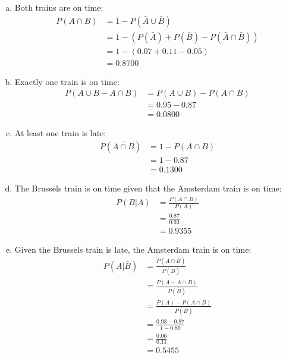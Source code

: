 \documentclass{scrartcl}
\begin{document}
\begin{enumerate}
\begin{enumerate}[a)]
\item Both trains are on time:\\
\begin{align*}
P(A \cap B) &= 1 - P(\bar{A}\cup\bar{B})\\
            &= 1 - \left(P(\bar{A}) + P(\bar{B}) - P(\bar{A}\cap\bar{B})\right)\\
            &= 1 - \left(0.07 + 0.11 - 0.05\right)\\
            &= 0.8700
\end{align*}

\item Exactly one train is on time:\\
\begin{align*}
P(A \cup B - A \cap B) &= P(A \cup B) - P(A \cap B)\\
                       &= 0.95 - 0.87\\
                       &= 0.0800
\end{align*}

\item At least one train is late:\\
\begin{align*}
P(\bar{A \cap B}) &= 1 - P(A \cap B)\\
                  &= 1 - 0.87\\
                  &= 0.1300
\end{align*}

\item The Brussels train is on time given that the Amsterdam train is on time:\\
\begin{align*}
P(B|A) &= \frac{P(A \cap B)}{P(A)}\\
       &= \frac{0.87}{0.93}\\
       &= 0.9355
\end{align*}

\item Given the Brussels train is late, the Amsterdam train is on time:\\
\begin{align*}
P(A|\bar{B}) &= \frac{P(A\cap\bar{B})}{P(\bar{B})}\\
             &= \frac{P(A - A \cap B)}{P(\bar{B})}\\
             &= \frac{P(A)-P(A \cap B)}{P(\bar{B})}\\
             &= \frac{0.93-0.87}{1-0.89}\\
             &= \frac{0.06}{0.11}\\
             &= 0.5455
\end{align*}


\end{enumerate}
\end{enumerate}
\end{document}
